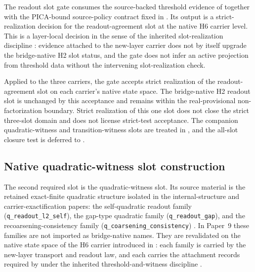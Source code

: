\documentclass[11pt]{article}
\newcommand{\OldLayer}{H2}
\newcommand{\NewLayer}{H6}
\newcommand{\PaperNine}{Paper~9}
\newcommand{\OldLayerStatus}{real-provisional non-factorization boundary}
\theoremstyle{definition}
\begin{document}
The readout slot gate consumes the source-backed threshold evidence of
 together with the PICA-bound
source-policy contract fixed in .  Its output is a
strict-realization decision for the readout-agreement slot at the native
\NewLayer{} carrier level.  This is a layer-local decision in the sense of the
inherited slot-realization discipline \cite{Tsiokos2026FoundationsII}: evidence
attached to the new-layer carrier does not by itself upgrade the bridge-native
\OldLayer{} slot status, and the gate does not infer an active projection from
threshold data without the intervening slot-realization check.

Applied to the three carriers, the gate accepts strict realization of the
readout-agreement slot on each carrier's native state space.  The
bridge-native \OldLayer{} readout slot is unchanged by this acceptance and
remains within the \OldLayerStatus{}.  Strict realization of this one slot does
not close the strict three-slot domain and does not license strict-test
acceptance.  The companion quadratic-witness and transition-witness slots are
treated in
,
and the all-slot closure test is deferred to
.

\subsection{Native quadratic-witness slot construction}\label{subsec:native-quadratic-witness-slot-construction}

The second required slot is the quadratic-witness slot.  Its source material is
the retained exact-finite quadratic structure isolated in the internal-structure
and carrier-exactification papers: the self-quadratic readout family
(\texttt{q\_readout\_l2\_self}), the gap-type quadratic family
(\texttt{q\_readout\_gap}), and the recoarsening-consistency family
(\texttt{q\_coarsening\_consistency})
\cite{Tsiokos2026InternalStructure,Tsiokos2026CarrierExactification}.  In
\PaperNine{} these families are not imported as bridge-native names.  They are
revalidated on the native state space of the \NewLayer{} carrier introduced in
: each family is carried by the new-layer transport and
readout law, and each carries the attachment records required by
 under the inherited
threshold-and-witness discipline \cite{Tsiokos2026FoundationsII}.
\end{document}
